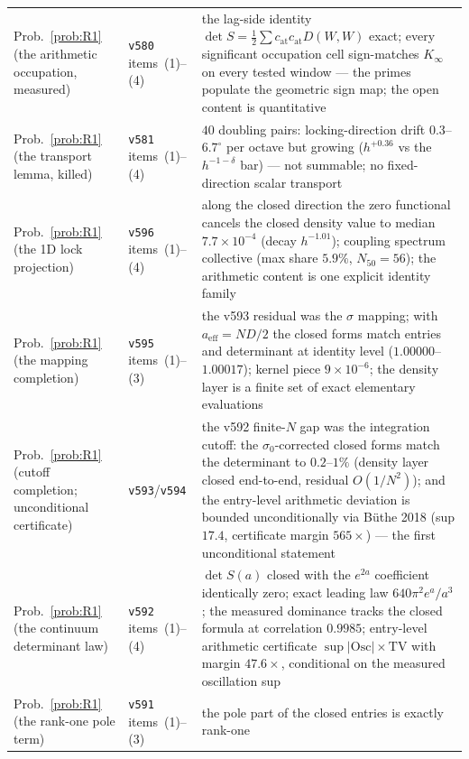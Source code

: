 \documentclass[11pt,a4paper]{article}
\theoremstyle{plain}
\theoremstyle{definition}
\begin{document}
{\begin{xltabular}{\textwidth}{@{}llY@{}}
Prob.~\ref{prob:R1} (the arithmetic occupation, measured)
  & \texttt{v580} items~(1)--(4)
  & the lag-side identity $\det S=\tfrac12\sum c_{\mathrm{at}}
    c_{\mathrm{at}}D(W,W)$ exact; every significant occupation cell
    sign-matches $K_\infty$ on every tested window --- the primes
    populate the geometric sign map; the open content is quantitative \\
Prob.~\ref{prob:R1} (the transport lemma, killed)
  & \texttt{v581} items~(1)--(4)
  & $40$ doubling pairs: locking-direction drift $0.3$--$6.7^\circ$ per
    octave but growing ($h^{+0.36}$ vs the $h^{-1-\delta}$ bar) --- not
    summable; no fixed-direction scalar transport \\
Prob.~\ref{prob:R1} (the 1D lock projection)
  & \texttt{v596} items~(1)--(4)
  & along the closed direction the zero functional cancels the closed
    density value to median $7.7\times10^{-4}$ (decay $h^{-1.01}$);
    coupling spectrum collective (max share $5.9\%$, $N_{50}=56$);
    the arithmetic content is one explicit identity family \\
Prob.~\ref{prob:R1} (the mapping completion)
  & \texttt{v595} items~(1)--(3)
  & the v593 residual was the $\sigma$ mapping; with
    $a_{\mathrm{eff}}=ND/2$ the closed forms match entries and
    determinant at identity level ($1.00000$--$1.00017$); kernel piece
    $9\times10^{-6}$; the density layer is a finite set of exact
    elementary evaluations \\
Prob.~\ref{prob:R1} (cutoff completion; unconditional certificate)
  & \texttt{v593}/\texttt{v594}
  & the v592 finite-$N$ gap was the integration cutoff: the
    $\sigma_0$-corrected closed forms match the determinant to
    $0.2$--$1\%$ (density layer closed end-to-end, residual
    $O(1/N^2)$); and the entry-level arithmetic deviation is bounded
    unconditionally via B\"uthe 2018 (sup $17.4$, certificate margin
    $565\times$) --- the first unconditional statement \\
Prob.~\ref{prob:R1} (the continuum determinant law)
  & \texttt{v592} items~(1)--(4)
  & $\det S(a)$ closed with the $e^{2a}$ coefficient identically zero;
    exact leading law $640\pi^2e^a/a^3$; the measured dominance tracks
    the closed formula at correlation $0.9985$; entry-level arithmetic
    certificate $\sup|\mathrm{Osc}|\times\mathrm{TV}$ with margin
    $47.6\times$, conditional on the measured oscillation sup \\
Prob.~\ref{prob:R1} (the rank-one pole term)
  & \texttt{v591} items~(1)--(3)
  & the pole part of the closed entries is exactly rank-one

\end{xltabular}}
\end{document}
